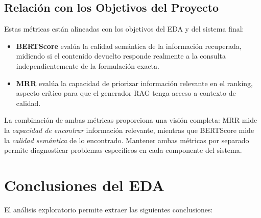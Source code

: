 \subsection{Relación con los Objetivos del Proyecto}

Estas métricas están alineadas con los objetivos del EDA y del sistema final:
\begin{itemize}
    \item \textbf{BERTScore} evalúa la calidad semántica de la información recuperada, midiendo si el contenido devuelto responde realmente a la consulta independientemente de la formulación exacta.
    \item \textbf{MRR} evalúa la capacidad de priorizar información relevante en el ranking, aspecto crítico para que el generador RAG tenga acceso a contexto de calidad.
\end{itemize}

La combinación de ambas métricas proporciona una visión completa: MRR mide la \textit{capacidad de encontrar} información relevante, mientras que BERTScore mide la \textit{calidad semántica} de lo encontrado. Mantener ambas métricas por separado permite diagnosticar problemas específicos en cada componente del sistema.

\section{Conclusiones del EDA}

El análisis exploratorio permite extraer las siguientes conclusiones:

